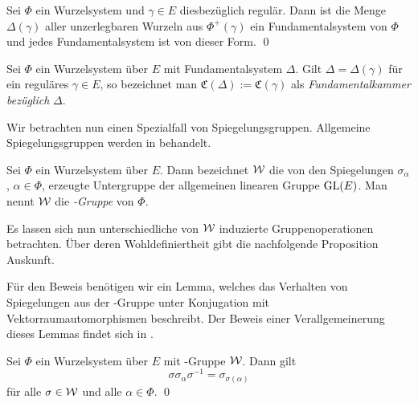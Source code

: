 \begin{thm}
  Sei $\Phi$ ein Wurzelsystem und $\gamma \in E$ diesbezüglich regulär.
  Dann ist die Menge $\Delta(\gamma)$ aller unzerlegbaren Wurzeln aus $\Phi^+(\gamma)$ ein Fundamentalsystem von $\Phi$ und jedes Fundamentalsystem ist von dieser Form. \qed
\end{thm}

\begin{defn}
  Sei $\Phi$ ein Wurzelsystem über $E$ mit Fundamentalsystem $\Delta$.
  Gilt $\Delta = \Delta(\gamma)$ für ein reguläres $\gamma \in E$, so bezeichnet man $\mathfrak{C}(\Delta) := \mathfrak{C}(\gamma)$ als \emph{Fundamentalkammer bezüglich} $\Delta$.
\end{defn}

Wir betrachten nun einen Spezialfall von Spiegelungsgruppen. Allgemeine Spiegelungsgruppen werden in \cite{humphreys1992reflection} behandelt.

\begin{defn}
  \label{def:weylgroup}
  Sei $\Phi$ ein Wurzelsystem über $E$. 
  Dann bezeichnet $\mathcal{W}$ die von den Spiegelungen $\sigma_\alpha$, $\alpha \in \Phi$, erzeugte Untergruppe der allgemeinen linearen Gruppe $\operatorname{GL}(E)$. 
  Man nennt $\mathcal{W}$ die \emph{\weyl\hyp{}Gruppe} von $\Phi$.
\end{defn}

Es lassen sich nun unterschiedliche von $\mathcal{W}$ induzierte Gruppenoperationen betrachten. Über deren Wohldefiniertheit gibt die nachfolgende Proposition Auskunft. 

Für den Beweis benötigen wir ein Lemma, welches das Verhalten von Spiegelungen aus der \weyl\hyp{}Gruppe unter Konjugation mit Vektorraumautomorphismen beschreibt. 
Der Beweis einer Verallgemeinerung dieses Lemmas findet sich in \cite[S.43]{humphreys1972introduction}.

\begin{lem}
  \label{lem:conjReflection}
  Sei $\Phi$ ein Wurzelsystem über $E$ mit \weyl\hyp{}Gruppe $\mathcal{W}$.
  Dann gilt 
  \begin{displaymath}
    \sigma \sigma_\alpha \sigma^{-1} = \sigma_{\sigma(\alpha)} 
  \end{displaymath}
  für alle $\sigma \in \mathcal{W}$ und alle $\alpha \in \Phi$. \qed
\end{lem}

